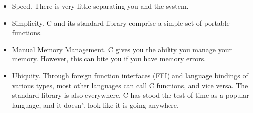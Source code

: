 \begin{itemize}
	\item Speed. There is very little separating you and the system.
	\item Simplicity.
    C and its standard library comprise a simple set of portable functions.
	\item Manual Memory Management.
    C gives you the ability you manage your memory.
    However, this can bite you if you have memory errors.
  \item Ubiquity.
    Through foreign function interfaces (FFI) and language bindings of various types, most other languages can call C functions, and vice versa.
    The standard library is also everywhere.
    C has stood the test of time as a popular language, and it doesn't look like it is going anywhere.
\end{itemize}


